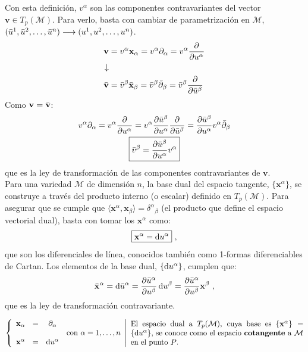 Con esta definición, $v^\alpha $ son las componentes contravariantes del vector $\mathbf{v}\in T_p(\mathcal{M})$. Para verlo, basta con cambiar de parametrización en $\mathcal{M}$, $(\Bar{u}^1,\Bar{u}^2,\ldots ,\Bar{u}^n)\longrightarrow (u^1,u^2,\ldots , u^n)$.
\begin{align*}
    \mathbf{v}&=v^\alpha \mathbf{x}_\alpha =v^\alpha \partial_\alpha =v^\alpha \pdv{}{u^\alpha }\\
    \downarrow&\\
    \Bar{\mathbf{v}}&=\Bar{v}^\beta \Bar{\mathbf{x}}_\beta =\Bar{v}^\beta \Bar{\partial}_\beta =\Bar{v}^\beta \pdv{}{\Bar{u}^\beta }
\end{align*}
Como $\mathbf{v}=\Bar{\mathbf{v}}$:
\begin{gather*}
    v^\alpha \partial_\alpha =v^\alpha \pdv{}{u^\alpha }=v^\alpha \pdv{\Bar{u}^\beta }{u^\alpha }\pdv{}{\Bar{u}^\beta }=\pdv{\Bar{u}^\beta }{u^\alpha } v^\alpha \Bar{\partial}_\beta \\
    \boxed{\Bar{v}^\beta =\pdv{\Bar{u}^\beta }{u^\alpha } v^\alpha }
\end{gather*}
que es la ley de transformación de las componentes contravariantes de $\mathbf{v}$. \\

Para una variedad $\mathcal{M}$ de dimensión $n$, la base dual del espacio tangente, $\{ \mathbf{x}^\alpha  \}$, se construye a través del producto interno (o escalar) definido en $T_p(\mathcal{M})$. Para asegurar que se cumple que $\langle \mathbf{x}^\alpha , \mathbf{x}_\beta \rangle =\delta ^\alpha {}_\beta  $ (el producto que define el espacio vectorial dual), basta con tomar los $\mathbf{x}^\alpha $ como:
$$
\boxed{\mathbf{x}^\alpha =\odif{u^\alpha }} \ ,
$$
que son los diferenciales de línea, conocidos también como 1-formas diferenciables de Cartan. Los elementos de la base dual, $\{ \odif{u^\alpha } \}$, cumplen que:
$$
\Bar{\mathbf{x}}^\alpha =\odif{\Bar{u}^\alpha }=\pdv{\Bar{u}^\alpha }{u^\beta }\odif{u^\beta} =\pdv{\Bar{u}^\alpha }{u^\beta } \mathbf{x}^\beta \ ,
$$
que es la ley de transformación contravariante.
\begin{mybox}
    $\left \{ \begin{array}{cccc}
        \mathbf{x}_\alpha  &=&\partial_\alpha&  \\
        &&&\text{con }\alpha =1,\ldots ,n\\
         \mathbf{x}^\alpha &=&\odif{u^\alpha }&
    \end{array} \right | \ \text{\parbox{8cm}{El espacio dual a $T_p(\mathcal{M})$, cuya base es $\{ \mathbf{x}^\alpha  \}=\{ \odif{u^\alpha } \}$, se conoce como el espacio \textbf{cotangente} a $\mathcal{M}$ en el punto $P$.}}$ 
\end{mybox}

